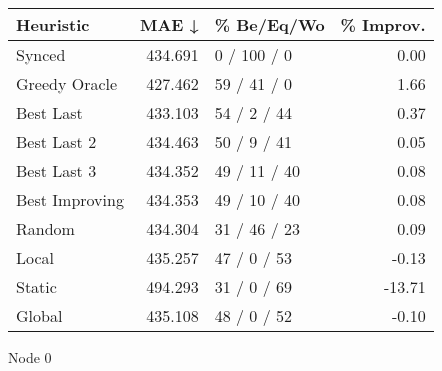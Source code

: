 \begin{tabular}{lrlr}
\toprule
\textbf{Heuristic} & \textbf{MAE ↓} & \textbf{\% Be/Eq/Wo} & \textbf{\% Improv.} \\
\midrule
            Synced &        434.691 &          0 / 100 / 0 &                0.00 \\
     Greedy Oracle &        427.462 &          59 / 41 / 0 &                1.66 \\
         Best Last &        433.103 &          54 / 2 / 44 &                0.37 \\
       Best Last 2 &        434.463 &          50 / 9 / 41 &                0.05 \\
       Best Last 3 &        434.352 &         49 / 11 / 40 &                0.08 \\
    Best Improving &        434.353 &         49 / 10 / 40 &                0.08 \\
            Random &        434.304 &         31 / 46 / 23 &                0.09 \\
             Local &        435.257 &          47 / 0 / 53 &               -0.13 \\
            Static &        494.293 &          31 / 0 / 69 &              -13.71 \\
            Global &        435.108 &          48 / 0 / 52 &               -0.10 \\
\bottomrule
\end{tabular}
\caption{Node 0}
\label{tab:non_lr05_le1_bs2_0}
